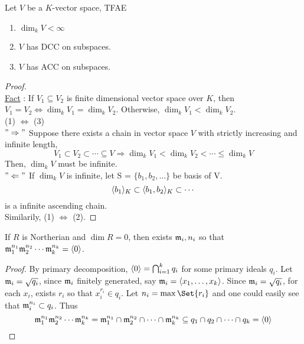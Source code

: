 \begin{lemma} \label{vector-space-dim-acc-dcc-relation}
  Let $V$ be a $K$-vector space, TFAE
  \begin{enumerate}[(1)]
    \item $\dim_k V < \infty$
    \item $V$ has DCC on subspaces.
    \item $V$ has ACC on subspaces.
  \end{enumerate}

  \begin{proof} $ $ \\
    \underline{Fact} : If $V_1 \subseteq V_2$ is finite dimensional vector space
    over $K$, then $V_1 = V_2 \iff \dim_k V_1 = \dim_k V_2$. Otherwise, $\dim_k V_1 < \dim_k V_2$. \\
    (1) $\Leftrightarrow$ (3) \\
    $"\Rightarrow"$ Suppose there exists a chain in vector space $V$ with strictly
    increasing and infinite length,
    $$
      V_1 \subset V_2 \subset \cdots \subseteq V \Rightarrow \dim_k V_1 < \dim_k V_2 < \cdots 
      \leq \dim_k V
    $$
    Then, $\dim_k V$ must be infinite. \\
    $"\Leftarrow"$ If $\dim_k V$ is infinite, let S = $\{b_1, b_2, \dots \}$ be basis of V.
    $$
      \langle b_1\rangle_K \subset \langle b_1 , b_2\rangle_K \subset \cdots
    $$
    is a infinite ascending chain.\\
    Similarily, (1) $\Leftrightarrow$ (2).
  \end{proof}
\end{lemma}

\begin{lemma}
If $R$ is Northerian and $\dim R = 0$, then exists $\mathfrak{m}_i, n_i$ so that
$\mathfrak{m}_1^{n_1} \mathfrak{m}_2^{n_2} \dotsm \mathfrak{m}_k^{n_k} = \langle0\rangle$.

\begin{proof}
  By primary decomposition, $\langle0\rangle = \bigcap_{i=1}^k q_i$ for
  some primary ideals $q_i$. Let $\mathfrak{m}_i = \sqrt{q_i}$, since
  $\mathfrak{m}_i$ finitely generated, say $\mathfrak{m}_i = \langle x_1, \dots, x_k\rangle$.
  Since $\mathfrak{m}_i = \sqrt{q_i}$, for each $x_i$, exists $r_i$
  so that $x_i^{r_i} \in q_i$. Let $n_i = \max \Set{r_i}$
  and one could easily see that $\mathfrak{m}_i^{n_i} \subset q_i$.
  Thus
  \[
    \mathfrak{m}_1^{n_1}\mathfrak{m}_2^{n_2} \dotsm \mathfrak{m}_k^{n_k} = 
    \mathfrak{m}_1^{n_1} \cap \mathfrak{m}_2^{n_2} \cap \dotsm \cap \mathfrak{m}_k^{n_k} \subseteq
    q_1 \cap q_2 \cap \dotsm \cap q_k = \langle0\rangle
  \]
\end{proof}
\end{lemma}

